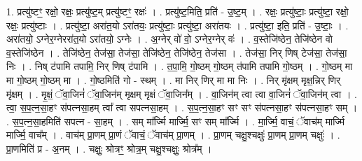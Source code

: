 \documentclass[17pt]{extarticle}
\begin{document}
1. प्रत्यु॑ष्टꣳ॒॒ रक्षो॒ रक्षः॒ प्रत्यु॑ष्ट॒म् प्रत्यु॑ष्टꣳ॒॒ रक्षः॑ । . प्रत्यु॑ष्ट॒मिति॒ प्रति॑ - उ॒ष्ट॒म् । . रक्षः॒ प्रत्यु॑ष्टाः॒ प्रत्यु॑ष्टा॒ रक्षो॒ रक्षः॒ प्रत्यु॑ष्टाः । . प्रत्यु॑ष्टा॒ अरा॑त॒यो ऽरा॑तयः॒ प्रत्यु॑ष्टाः॒ प्रत्यु॑ष्टा॒ अरा॑तयः । . प्रत्यु॑ष्टा॒ इति॒ प्रति॑ - उ॒ष्टाः॒ । . अरा॑तयो॒ ऽग्नेर॒ग्नेररा॑त॒यो ऽरा॑तयो॒ ऽग्नेः । . अ॒ग्नेर् वो॑ वो॒ ऽग्नेर॒ग्नेर् वः॑ । . व॒स्तेजि॑ष्ठेन॒ तेजि॑ष्ठेन वो व॒स्तेजि॑ष्ठेन । . तेजि॑ष्ठेन॒ तेज॑सा॒ तेज॑सा॒ तेजि॑ष्ठेन॒ तेजि॑ष्ठेन॒ तेज॑सा । . तेज॑सा॒ निर् णिष् टेज॑सा॒ तेज॑सा॒ निः । . निष् ट॑पामि तपामि॒ निर् णिष् ट॑पामि । . त॒पा॒मि॒ गो॒ष्ठम् गो॒ष्ठम् त॑पामि तपामि गो॒ष्ठम् । . गो॒ष्ठम् मा मा गो॒ष्ठम् गो॒ष्ठम् मा । . गो॒ष्ठमिति॑ गो - स्थम् । . मा निर् णिर् मा मा निः । . निर् मृ॑क्षम् मृक्ष॒न्निर् णिर् मृ॑क्षम् । . मृ॒क्षं॒ ॅवा॒जिनं॑ ॅवा॒जिन॑म् मृक्षम् मृक्षं ॅवा॒जिन᳚म् । . वा॒जिन॑म् त्वा त्वा वा॒जिनं॑ ॅवा॒जिन॑म् त्वा । . त्वा॒ स॒प॒त्न॒सा॒हꣳ स॑पत्नसा॒हम् त्वा᳚ त्वा सपत्नसा॒हम् । . स॒प॒त्न॒सा॒हꣳ सꣳ सꣳ स॑पत्नसा॒हꣳ स॑पत्नसा॒हꣳ सम् । . स॒प॒त्न॒सा॒हमिति॑ सपत्न - सा॒हम् । . सम् मा᳚र्ज्मि मार्ज्मि॒ सꣳ सम् मा᳚र्ज्मि । . मा॒र्ज्मि॒ वाचं॒ ॅवाच॑म् मार्ज्मि मार्ज्मि॒ वाच᳚म् । . वाच॑म् प्रा॒णम् प्रा॒णं ॅवाचं॒ ॅवाच॑म् प्रा॒णम् । . प्रा॒णम् चक्षु॒श्चक्षुः॑ प्रा॒णम् प्रा॒णम् चक्षुः॑ । . प्रा॒णमिति॑ प्र - अ॒नम् । . चक्षुः॒ श्रोत्रꣳ॒॒ श्रोत्र॒म् चक्षु॒श्चक्षुः॒ श्रोत्र᳚म् । \newline
\end{document}
